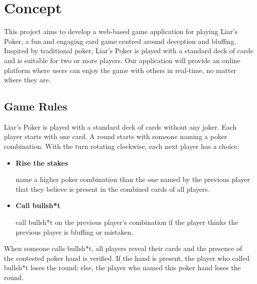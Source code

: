 \documentclass{scrartcl}
\begin{document}

\section{Concept}\label{concept}


This project aims to develop a web-based game application for playing Liar's Poker, a fun and engaging
card game centred around deception and bluffing. Inspired by traditional poker, Liar's Poker is played
with a standard deck of cards and is suitable for two or more players. Our application will provide an
online platform where users can enjoy the game with others in real-time, no matter where they are.

\subsection{Game Rules}\label{game-rules}
Liar's Poker is played with a standard deck of cards without any joker. Each player starts with one
card. A round starts with someone naming a poker combination. With the turn rotating clockwise, each
next player has a choice:
\begin{itemize}
      \item \textbf{Rise the stakes}\par
            name a higher poker combination than the one named by the previous player that
            they believe is present in the combined cards of all players.
      \item \textbf{Call bullsh*t} \par
            call bullsh*t on the previous player's combination if the player thinks the previous
            player is bluffing or mistaken.
\end{itemize}
When someone calls bullsh*t, all players reveal their cards and the presence of the contested poker
hand is verified. If the hand is present, the player who called bullsh*t loses the round; else, the
player who named this poker hand loses the round.
\end{document}
